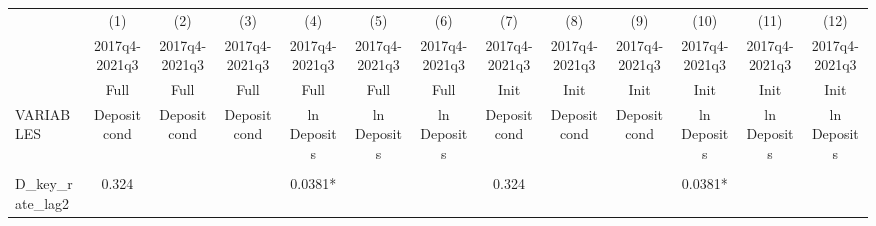 \documentclass[]{article}
\begin{document}
\begin{center}
\begin{tabular}{lcccccccccccc} \hline
 & (1) & (2) & (3) & (4) & (5) & (6) & (7) & (8) & (9) & (10) & (11) & (12) \\
 & 2017q4-2021q3 & 2017q4-2021q3 & 2017q4-2021q3 & 2017q4-2021q3 & 2017q4-2021q3 & 2017q4-2021q3 & 2017q4-2021q3 & 2017q4-2021q3 & 2017q4-2021q3 & 2017q4-2021q3 & 2017q4-2021q3 & 2017q4-2021q3 \\
 & Full & Full & Full & Full & Full & Full & Init & Init & Init & Init & Init & Init \\
VARIABLES & Deposit cond & Deposit cond & Deposit cond & ln Deposits & ln Deposits & ln Deposits & Deposit cond & Deposit cond & Deposit cond & ln Deposits & ln Deposits & ln Deposits \\ \hline
\vspace{4pt} & \begin{footnotesize}\end{footnotesize} & \begin{footnotesize}\end{footnotesize} & \begin{footnotesize}\end{footnotesize} & \begin{footnotesize}\end{footnotesize} & \begin{footnotesize}\end{footnotesize} & \begin{footnotesize}\end{footnotesize} & \begin{footnotesize}\end{footnotesize} & \begin{footnotesize}\end{footnotesize} & \begin{footnotesize}\end{footnotesize} & \begin{footnotesize}\end{footnotesize} & \begin{footnotesize}\end{footnotesize} & \begin{footnotesize}\end{footnotesize} \\
D\_key\_rate\_lag2 & 0.324 &  &  & 0.0381* &  &  & 0.324 &  &  & 0.0381* &  &  \\

\end{tabular}
\end{center}
\end{document}
